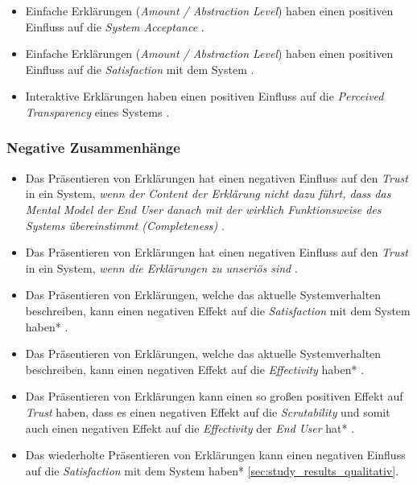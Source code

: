 \begin{itemize}
    \item Einfache Erklärungen (\textit{Amount / Abstraction Level}) haben einen positiven Einfluss auf die \textit{System Acceptance} \cite{hleg2019policy, sovrano_modelling_2020}.
    \item Einfache Erklärungen (\textit{Amount / Abstraction Level}) haben einen positiven Einfluss auf die \textit{Satisfaction} mit dem System \cite{hleg2019policy, sovrano_modelling_2020}.
    \item Interaktive Erklärungen haben einen positiven Einfluss auf die \textit{Perceived Transparency} eines Systems \cite{cheng2019explaining}.
\end{itemize}



\subsubsection*{Negative Zusammenhänge}

\begin{itemize}
    \item Das Präsentieren von Erklärungen hat einen negativen Einfluss auf den \textit{Trust} in ein System, \textit{wenn der Content der Erklärung nicht dazu führt, dass das Mental Model der End User danach mit der wirklich Funktionsweise des Systems übereinstimmt (Completeness)} \cite{schrills_color_2020, chazette_end-users_nodate}.
    \item Das Präsentieren von Erklärungen hat einen negativen Einfluss auf den \textit{Trust} in ein System, \textit{wenn die Erklärungen zu unseriös sind} \cite{wang_is_2018}.
    \item Das Präsentieren von Erklärungen, welche das aktuelle Systemverhalten beschreiben, kann einen negativen Effekt auf die \textit{Satisfaction} mit dem System haben* \cite{koo_why_2015}.
    \item Das Präsentieren von Erklärungen, welche das aktuelle Systemverhalten beschreiben, kann einen negativen Effekt auf die \textit{Effectivity} haben* \cite{koo_why_2015}.
    \item Das Präsentieren von Erklärungen kann einen so großen positiven Effekt auf \textit{Trust} haben, dass es einen negativen Effekt auf die \textit{Scrutability} und somit auch einen negativen Effekt auf die \textit{Effectivity} der \textit{End User} hat* \cite{kohl_explainability_2019, gunning2019darpa}.
    \item Das wiederholte Präsentieren von Erklärungen kann einen negativen Einfluss auf die \textit{Satisfaction} mit dem System haben* \autoref{sec:study_results_qualitativ}.
\end{itemize}

